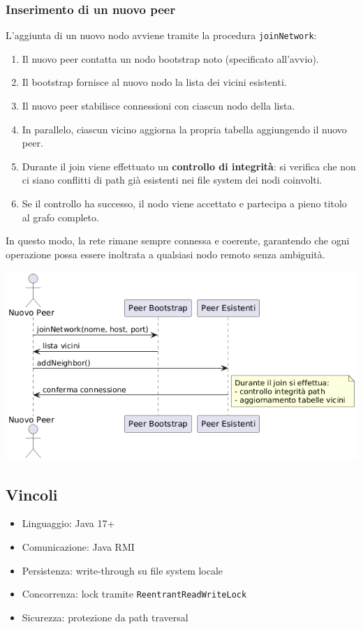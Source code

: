 \documentclass[11pt]{article}
\begin{document}
\subsubsection{Inserimento di un nuovo peer}
\label{sec:org245225a}
L’aggiunta di un nuovo nodo avviene tramite la procedura \texttt{joinNetwork}:
\begin{enumerate}
\item Il nuovo peer contatta un nodo bootstrap noto (specificato all’avvio).
\item Il bootstrap fornisce al nuovo nodo la lista dei vicini esistenti.
\item Il nuovo peer stabilisce connessioni con ciascun nodo della lista.
\item In parallelo, ciascun vicino aggiorna la propria tabella aggiungendo il nuovo peer.
\item Durante il join viene effettuato un \textbf{controllo di integrità}: si verifica che non ci
siano conflitti di path già esistenti nei file system dei nodi coinvolti.
\item Se il controllo ha successo, il nodo viene accettato e partecipa a pieno titolo al
grafo completo.
\end{enumerate}
In questo modo, la rete rimane sempre connessa e coerente, garantendo che ogni operazione
possa essere inoltrata a qualsiasi nodo remoto senza ambiguità.
\begin{center}
\includegraphics[width=.9\linewidth]{./img/join.png}
\end{center}
\subsection{Vincoli}
\label{sec:org9e06f46}
\begin{itemize}
\item Linguaggio: Java 17+
\item Comunicazione: Java RMI
\item Persistenza: write-through su file system locale
\item Concorrenza: lock tramite \texttt{ReentrantReadWriteLock}
\item Sicurezza: protezione da path traversal
\end{itemize}
\end{document}
